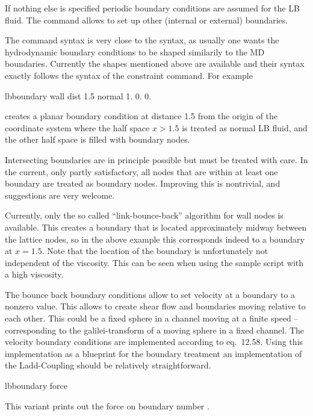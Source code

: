 If nothing else is specified periodic boundary conditions are assumed 
for the LB fluid. The  command allows to set up
other (internal or external) boundaries.

The  command syntax is very close to the
 syntax, as usually one wants the hydrodynamic
boundary conditions to be shaped similarily to the MD
boundaries. Currently the shapes mentioned above are available and
their syntax exactly follows the syntax of the constraint command. For
example
\begin{tclcode}
  lbboundary wall dist 1.5 normal 1. 0. 0. 
\end{tclcode}
creates a planar boundary condition at distance 1.5 from the origin of
the coordinate system where the half space $x>1.5$ is treated as
normal LB fluid, and the other half space is filled with boundary
nodes.

Intersecting boundaries are in principle possible but must be treated
with care. 
In the current, only partly satisfactory, all nodes that are within at least
one boundary are treated as boundary nodes. Improving this is nontrivial, 
and suggestions are very welcome.

Currently, only the so called ``link-bounce-back'' algorithm for wall
nodes is available. This creates a boundary that is located
approximately midway between the lattice nodes, so in the above
example this corresponds indeed to a boundary at $x=1.5$. Note that
the location of the boundary is unfortunately not independent of the
viscosity. This can \eg be seen when using the sample script
 with a high viscosity.

The bounce back boundary conditions allow to set velocity at a boundary to a nonzero
value. This allows to create shear flow and boundaries moving relative to 
each other. This could be a fixed sphere in a channel moving at a finite speed -- 
corresponding to the galilei-transform of a moving sphere in a fixed channel.
The velocity boundary conditions are implemented according to \cite{succi01a}
eq.~12.58. Using this implementation as a blueprint for the boundary treatment 
an implementation of the Ladd-Coupling should be relatively straightforward.

\begin{essyntax}
  lbboundary force 
  \begin{features}
  \end{features}
\end{essyntax}
This variant prints out the force on boundary number .

